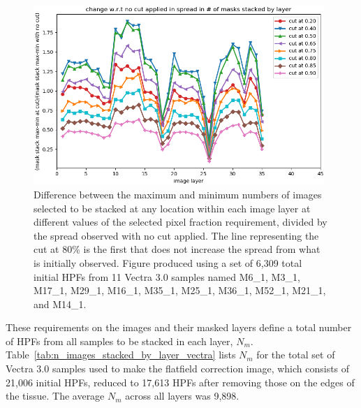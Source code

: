 \documentclass[letterpaper,11pt]{article}
\newcommand{\reftab}[1]{Table~\ref{#1}}
\begin{document}
\begin{figure}[!ht]
\centering
\includegraphics[width=0.98\textwidth]{images/measuring_flatfield_corrections/example_mask_stack_spreads_by_layer}
\caption{\footnotesize Difference between the maximum and minimum numbers of images selected to be stacked at any location within each image layer at different values of the selected pixel fraction requirement, divided by the spread observed with no cut applied. The line representing the cut at 80\% is the first that does not increase the spread from what is initially observed. Figure produced using a set of 6,309 total initial HPFs from 11 Vectra 3.0 samples named M6\_1, M3\_1, M17\_1, M29\_1, M16\_1, M35\_1, M25\_1, M36\_1, M52\_1, M21\_1, and M14\_1.}
\label{fig:selected_pixel_fraction_cut_2}
\end{figure} 

These requirements on the images and their masked layers define a total number of HPFs from all samples to be stacked in each layer, $N_{m}$. \reftab{tab:n_images_stacked_by_layer_vectra} lists $N_{m}$ for the total set of Vectra 3.0 samples used to make the flatfield correction image, which consists of 21,006 initial HPFs, reduced to 17,613 HPFs after removing those on the edges of the tissue. The average $N_{m}$ across all layers was 9,898.
\end{document}

